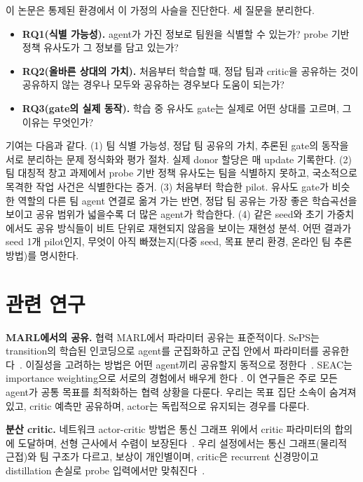 \documentclass[twocolumn,10pt]{article}
\begin{document}
이 논문은 통제된 환경에서 이 가정의 사슬을 진단한다. 세 질문을 분리한다.
\begin{itemize}
  \item \textbf{RQ1(식별 가능성).} agent가 가진 정보로 팀원을 식별할 수 있는가? probe 기반 정책 유사도가 그 정보를 담고 있는가?
  \item \textbf{RQ2(올바른 상대의 가치).} 처음부터 학습할 때, 정답 팀과 critic을 공유하는 것이 공유하지 않는 경우나 모두와
    공유하는 경우보다 도움이 되는가?
  \item \textbf{RQ3(gate의 실제 동작).} 학습 중 유사도 gate는 실제로 어떤 상대를 고르며, 그 이유는 무엇인가?
\end{itemize}

기여는 다음과 같다. (1) 팀 식별 가능성, 정답 팀 공유의 가치, 추론된 gate의 동작을 서로 분리하는 문제 정식화와 평가
절차. 실제 donor 할당은 매 update 기록한다. (2) 팀 대칭적 창고 과제에서 probe 기반 정책 유사도는 팀을 식별하지 못하고,
국소적으로 목격한 작업 사건은 식별한다는 증거. (3) 처음부터 학습한 pilot. 유사도 gate가 비슷한 역할의 다른 팀 agent
연결로 옮겨 가는 반면, 정답 팀 공유는 가장 좋은 학습곡선을 보이고 공유 범위가 넓을수록 더 많은 agent가 학습한다.
(4) 같은 seed와 초기 가중치에서도 공유 방식들이 비트 단위로 재현되지 않음을 보이는 재현성 분석. 어떤 결과가 seed 1개
pilot인지, 무엇이 아직 빠졌는지(다중 seed, 목표 분리 환경, 온라인 팀 추론 방법)를 명시한다.

\section{관련 연구}
\textbf{MARL에서의 공유.} 협력 MARL에서 파라미터 공유는 표준적이다. SePS는 transition의 학습된 인코딩으로 agent를
군집화하고 군집 안에서 파라미터를 공유한다~\cite{christianos2021seps}. 이질성을 고려하는 방법은 어떤 agent끼리 공유할지
동적으로 정한다~\cite{hu2025heterogeneity}. SEAC는 importance weighting으로 서로의 경험에서 배우게 한다
\cite{christianos2020seac}. 이 연구들은 주로 모든 agent가 공통 목표를 최적화하는 협력 상황을 다룬다. 우리는 목표 집단
소속이 숨겨져 있고, critic 예측만 공유하며, actor는 독립적으로 유지되는 경우를 다룬다.

\textbf{분산 critic.} 네트워크 actor-critic 방법은 통신 그래프 위에서 critic 파라미터의 합의에 도달하며, 선형 근사에서
수렴이 보장된다~\cite{zhang2018networked}. 우리 설정에서는 통신 그래프(물리적 근접)와 팀 구조가 다르고, 보상이
개인별이며, critic은 recurrent 신경망이고 distillation 손실로 probe 입력에서만 맞춰진다~\cite{rusu2016policy}.
\end{document}
